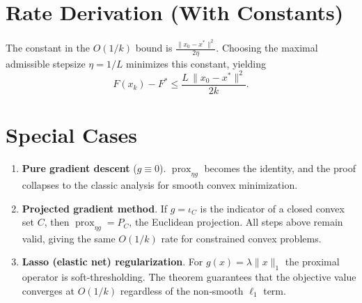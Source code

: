 \documentclass{article}
\newcommand{\prox}{\operatorname{prox}}
\begin{document}
\section*{Rate Derivation (With Constants)}
The constant in the $O(1/k)$ bound is $\frac{\|x_{0}-x^{*}\|^{2}}{2\eta}$.  
Choosing the maximal admissible stepsize $\eta=1/L$ minimizes this constant, yielding
\[
F(x_{k})-F^{*}\le\frac{L\,\|x_{0}-x^{*}\|^{2}}{2k}.
\]

\section*{Special Cases}
\begin{enumerate}
    \item \textbf{Pure gradient descent} ($g\equiv0$).  $\prox_{\eta g}$ becomes the identity, and the proof collapses to the classic analysis for smooth convex minimization.
    \item \textbf{Projected gradient method}.  If $g=\iota_{C}$ is the indicator of a closed convex set $C$, then $\prox_{\eta g}=P_{C}$, the Euclidean projection.  All steps above remain valid, giving the same $O(1/k)$ rate for constrained convex problems.
    \item \textbf{Lasso (elastic net) regularization}.  For $g(x)=\lambda\|x\|_{1}$ the proximal operator is soft‑thresholding.  The theorem guarantees that the objective value converges at $O(1/k)$ regardless of the non‑smooth $\ell_{1}$ term.
\end{enumerate}
\end{document}
